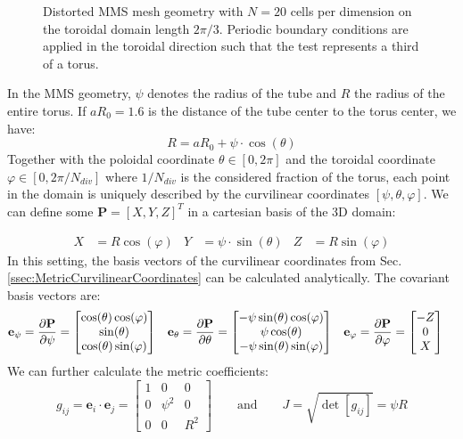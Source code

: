 \begin{figure}[H]
\begin{subfigure}[b]{0.4\textwidth}
		\label{fig:MMSModelTorturedCrossSection}
	\end{subfigure}	
	\caption[Distorted MMS mesh geometry with $N=20$ cells per dimension on the toroidal domain length $2\pi / 3$]{Distorted MMS mesh geometry with $N=20$ cells per dimension on the toroidal domain length $2\pi / 3$. Periodic boundary conditions are applied in the toroidal direction such that the test represents a third of a torus. }
	\label{fig:MMSModelScheme}
\end{figure}

In the MMS geometry, $\psi$ denotes the radius of the tube and $R$ the radius of the entire torus. If $aR_0=1.6$ is the distance of the tube center to the torus center, we have:
$$  R = aR_0 + \psi\cdot\cos(\theta) $$
Together with the poloidal coordinate $\theta\in[0,2\pi]$ and the toroidal coordinate $\varphi\in[0,2\pi/N_{div}]$ where $1/N_{div}$ is the considered fraction of the torus, each point in the domain is uniquely described by the curvilinear coordinates $[\psi,\theta,\varphi]$. 
We can define some $\mathbf{P} = [X,Y,Z]^T$ in a cartesian basis of the 3D domain:

\begin{align*}
	X &= R\cos(\varphi) &  Y &= \psi\cdot\sin(\theta)  &  Z &= R\sin(\varphi)
\end{align*} 
In this setting, the basis vectors of the curvilinear coordinates from Sec. \ref{ssec:MetricCurvilinearCoordinates} can be calculated analytically. The covariant basis vectors are:
\begin{align*}
	\mathbf{e}_\psi &= \pdv{\mathbf{P}}{\psi} = \begin{bmatrix} \cos(\theta)\cos(\varphi) \\ \sin(\theta) \\ \cos(\theta)\sin(\varphi) \end{bmatrix} & \mathbf{e}_\theta &= \pdv{\mathbf{P}}{\theta} = \begin{bmatrix} -\psi\sin(\theta)\cos(\varphi) \\ \psi\cos(\theta) \\ -\psi\sin(\theta)\sin(\varphi) \end{bmatrix} & \mathbf{e}_\varphi &= \pdv{\mathbf{P}}{\varphi} = \begin{bmatrix} -Z \\ 0 \\ X \end{bmatrix}
\end{align*}
We can further calculate the metric coefficients:
$$ g_{ij} = \mathbf{e}_i\cdot\mathbf{e}_j
= \begin{bmatrix}
	1 & 0 & 0 \\ 0 & \psi^2 & 0 \\ 0 & 0 & R^2
\end{bmatrix} \qquad \text{and} \qquad J = \sqrt{\det[g_{ij}]} = \psi R$$
 
